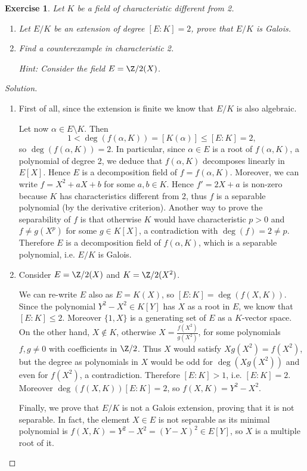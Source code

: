 \documentclass[a4paper,10pt,reqno]{amsart}
\newtheorem{ex}{Exercise}[section]
\newenvironment{sol}
  {\renewcommand\qedsymbol{$\blacksquare$}\begin{proof}[Solution]}
  {\end{proof}}
\begin{document}
\begin{ex}
\label{7.1}
    Let $K$ be a field of characteristic different from 2. 
    \begin{enumerate}
        \item  Let $E/K$ be an extension of degree $[E:K]=2$, prove that $E/K$ is Galois.
        \item Find a counterexample in characteristic 2.
        
        \noindent \textit{Hint: }Consider the field $E=\Z/2(X)$. 
    \end{enumerate}
\end{ex}
\begin{sol}~
\begin{enumerate}
    \item First of all, since the extension is finite we know that 
$E/K$ is also algebraic.

Let now $\alpha \in E\setminus K$.
Then 
$$1<\deg(f(\alpha,K))=[K(\alpha)]\leq [E:K]=2,$$
so $\deg(f(\alpha,K))=2$.
In particular, since $\alpha\in E$ is a root of $f(\alpha,K)$, 
a polynomial of degree 2,
we deduce that $f(\alpha,K)$
decomposes linearly in $E[X]$.
Hence $E$ is a decomposition field
of $f=f(\alpha,K)$.
Moreover, we can write $f=X^2+aX+b$ for some $a,b\in K$.
Hence $f'=2X+a$ is non-zero because $K$ has characteristics different from 2,
thus $f$ is a separable polynomial (by the derivative criterion).
Another way to prove the separability of $f$
is that otherwise $K$ would have characteristic $p>0$
and $f\neq g(X^p)$ for some $g\in K[X]$,
a contradiction with $\deg(f)=2\neq p$.
Therefore $E$ is a decomposition field of $f(\alpha,K)$, which is 
a separable polynomial, i.e. $E/K$ is Galois.
\item Consider $E=\Z/2(X)$ and $K=\Z/2(X^2)$.

We can re-write $E$ also as $E=K(X)$, so $[E:K]=\deg(f(X,K))$.
Since the polynomial $Y^2-X^2\in K[Y]$
has $X$ as a root in $E$, we know that $[E:K]\leq 2$.
Moreover $\{1,X\}$ is a generating set of $E$ as a $K$-vector space.
On the other hand, $X\notin K$, otherwise $X=\frac{f(X^2)}{g(X^2)}$, for some polynomials $f,g \neq 0$ with coefficients in $\Z/2$.
Thus $X$ would satisfy $Xg(X^2)=f(X^2)$,
but the degree as polynomials in $X$ would be odd for
$\deg(Xg(X^2))$ and even for $f(X^2)$, a contradiction.
Therefore $[E:K]>1$, i.e. $[E:K]=2$.
Moreover $\deg(f(X,K))[E:K]=2$, so $f(X,K)=Y^2-X^2$.

Finally, we prove that $E/K$ is not a Galois extension, proving that it is not separable.
In fact, the element $X\in E$ is not separable as its minimal polynomial is
$f(X,K)=Y^2-X^2=(Y-X)^2\in E[Y]$,
so $X$ is a multiple root of it. \qedhere
\end{enumerate}
\end{sol}
\end{document}
